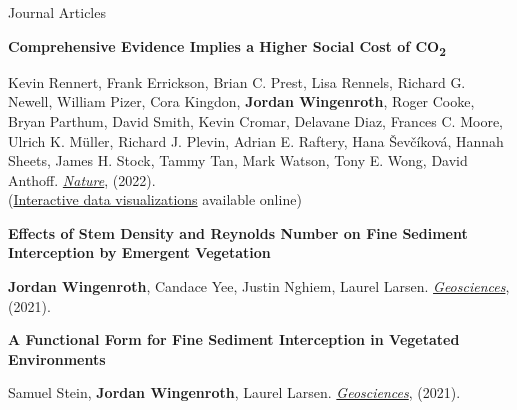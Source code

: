 \documentclass{resume} %
\begin{document}
\begin{rSection}{Journal Articles}

{\bf Comprehensive Evidence Implies a Higher Social Cost of CO\textsubscript{2}}
\vspace{-7pt}
\begin{adjustwidth}{12pt}{}
{\small Kevin Rennert, Frank Errickson, Brian C. Prest, Lisa Rennels, Richard G. Newell, William Pizer, Cora Kingdon, \textbf{Jordan Wingenroth}, Roger Cooke, Bryan Parthum, David Smith, Kevin Cromar, Delavane Diaz, Frances C. Moore, Ulrich K. M\"{u}ller, Richard J. Plevin, Adrian E. Raftery, Hana \v{S}ev\v{c}\'{i}kov\'{a}, Hannah Sheets, James H. Stock, Tammy Tan, Mark Watson, Tony E. Wong, David Anthoff. \textit{\href{https://www.nature.com/articles/s41586-022-05224-9}{Nature}}, (2022).\\
(\href{https://www.rff.org/publications/data-tools/scc-explorer/}{Interactive data visualizations} available online)}
\end{adjustwidth}

{\bf Effects of Stem Density and Reynolds Number on Fine Sediment Interception by Emergent Vegetation}
\vspace{-7pt}
\begin{adjustwidth}{12pt}{}
{\small \textbf{Jordan Wingenroth}, Candace Yee, Justin Nghiem, Laurel Larsen. \textit{\href{https://www.mdpi.com/2076-3263/11/3/136}{Geosciences}}, (2021).}
\end{adjustwidth}

{\bf A Functional Form for Fine Sediment Interception in Vegetated Environments}
\vspace{-7pt}
\begin{adjustwidth}{12pt}{}
{\small Samuel Stein, \textbf{Jordan Wingenroth}, Laurel Larsen. \textit{\href{https://www.mdpi.com/2076-3263/11/4/157}{Geosciences}}, (2021).}
\end{adjustwidth}

\end{rSection}
\end{document}
